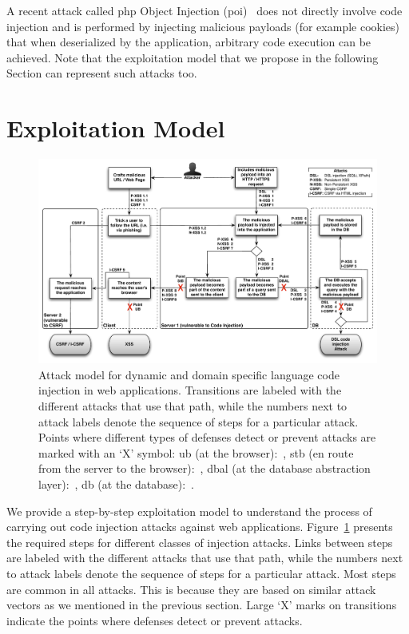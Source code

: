 \documentclass[conference]{IEEEtran}
\begin{document}
A recent attack called {\sc php} Object Injection
({\sc poi})~\cite{DKH14} does not directly involve code
injection and is performed by injecting malicious
payloads (for example cookies) that when deserialized
by the application, arbitrary code execution can be
achieved. Note that the exploitation model that we propose
in the following Section can represent such attacks too.

\section{Exploitation Model}
\label{sec:model}

\begin{figure}[t]
\begin{center}
\leavevmode
\includegraphics[scale=0.55]{attacks-steps-CSRF.pdf}
\end{center}
\caption{\label{fig:attacks}Attack model for dynamic and domain specific
language code injection in web applications.
Transitions are labeled with the different attacks that use that path,
while the numbers next to attack labels denote the 
sequence of steps for a particular attack.
Points where different types of defenses
detect or prevent attacks are marked with an `X' symbol:
{\sc ub} (at the browser):~\cite{KJKV09,LV09,TNH07,NSS06,APKLM10,ML10,YCIS07,PSC09,VDDPJ11,OWVS08,DDHPJ10,VFJKKV07,SLMS14,BV08,SSM10},
{\sc s}t{\sc b} (en route from the server to the browser):~\cite{RDWDE07,JKK06a,GC09,JB07,NLC07,WPLKK09,JEP08,PS11},
{\sc dbal} (at the database abstraction layer):~\cite{BWS05,SW06,HCF05,XBS06,PB05,PMP11,MS09,HO05,SMS13},
{\sc db} (at the database):~\cite{BK04,LLW02,VMV05}.}
\end{figure}


We provide a step-by-step exploitation model to understand the process
of carrying out code injection attacks against web
applications. Figure~\ref{fig:attacks} presents the required steps for
different classes of injection attacks. Links between steps are
labeled with the different attacks that use that path, while the
numbers next to attack labels denote the sequence of steps for a
particular attack. Most steps are common in all attacks. This is
because they are based on similar attack vectors as we mentioned in
the previous section. Large `X' marks on transitions indicate the
points where defenses detect or prevent attacks.
\end{document}
